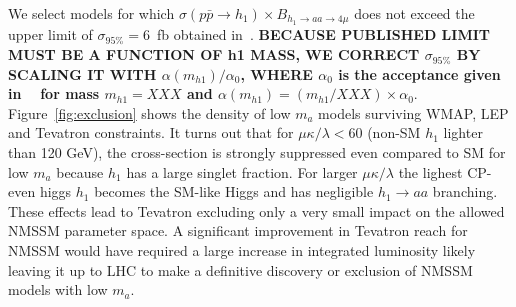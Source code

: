 \documentclass[aps,prl,twocolumn,nofootinbib,superscriptaddress]{revtex4}
\begin{document}
We select models for which $\sigma(p\bar{p} \to h_1) \times B_{h_1 \to aa \to
4\mu}$ does not exceed the upper limit of $\sigma_{95\%}=6$~fb obtained in~\cite{d0-low-ma}. {\bf BECAUSE 
PUBLISHED LIMIT MUST BE A FUNCTION OF h1 MASS, WE CORRECT $\sigma_{95\%}$ BY SCALING IT WITH $\alpha(m_{h1})/ \alpha_0$,
WHERE $\alpha_0$ is the acceptance given in ~\cite{d0-low-ma} for mass $m_{h1}=XXX$ and $\alpha(m_{h1}) = (m_{h1}/XXX) \times \alpha_0$}. 
Figure~\ref{fig:exclusion} shows the density of low $m_a$ models surviving WMAP, LEP and Tevatron constraints. 
It turns out that for $\mu\kappa/\lambda<60$ (non-SM $h_1$ lighter than 120 GeV), the cross-section 
is strongly suppressed even compared to SM for low $m_a$ because $h_1$ has a large singlet fraction. For 
larger $\mu\kappa/\lambda$ the lighest CP-even higgs $h_1$ becomes the SM-like Higgs and has negligible 
$h_1 \to aa$ branching.  These effects lead to Tevatron excluding only a very small impact on the allowed 
NMSSM parameter space. A significant improvement in Tevatron reach for NMSSM would have required a large increase 
in integrated luminosity likely leaving it up to LHC to make a definitive discovery or exclusion of
NMSSM models with low $m_a$.





\end{document}
